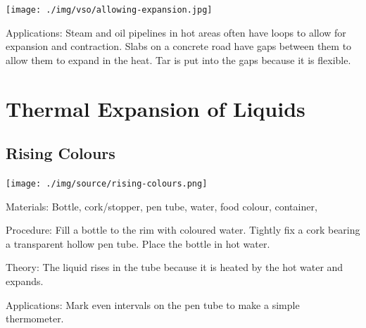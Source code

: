 \begin{multicols}{2}
\begin{center}
\texttt{[image: ./img/vso/allowing-expansion.jpg]}
\end{center}

\begin{description*}
\item[Applications:]{Steam and oil pipelines in hot areas often have loops to allow for expansion and contraction. Slabs on a concrete road have gaps between them to allow them to expand in the heat. Tar is put into the gaps because it is flexible.}
\end{description*}


\section*{Thermal Expansion of Liquids}


\subsection{Rising Colours}

\begin{center}
\texttt{[image: ./img/source/rising-colours.png]}
\end{center}

\begin{description*}
\item[Materials:]{Bottle, cork/stopper, pen tube, water, food colour, container, }
\item[Procedure:]{Fill a bottle to the rim with coloured water. Tightly fix a cork bearing a transparent hollow pen tube. Place the bottle in hot water.}
\item[Theory:]{The liquid rises in the tube because it is heated by the hot water and expands.}
\item[Applications:]{Mark even intervals on the pen tube to make a simple thermometer.}
\end{description*}


\end{multicols}
